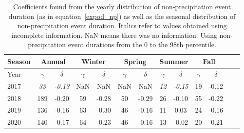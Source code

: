 \begin{table}[htb]
  \begin{center}
    \begin{tabular}{|l|*{11}{c|}r|}
      \hline Season & \multicolumn{2}{|c|}{Annual} &
      \multicolumn{2}{|c|}{Winter}& \multicolumn{2}{|c|}{Spring} &
      \multicolumn{2}{|c|}{Summer} &\multicolumn{2}{|c|}{Fall} \\ \hline
      Year & $\gamma $ & $\delta$ & $\gamma $ & $\delta$ & $\gamma $ &
      $\delta$ & $\gamma $ & $\delta$ & $\gamma $ & $\delta$\\ \hline 2017 &
      \textit{33} & \textit{-0.13} & NaN & NaN & NaN & NaN & \textit{12} &
      \textit{-0.15} & 19 & -0.12 \\ 2018 & 189 & -0.20 & 59 & -0.28 & 50 &
      -0.29 & 26 & -0.10 & 55 & -0.22 \\ 2019 & 136 & -0.16 & 63 & -0.30 &
      46 & -0.16 & 11 & 0.03 & 24 & -0.16 \\ 2020 & 140 & -0.17 & 64 & -0.23
      & 46 & -0.16 & 13 & -0.02 & 20 & -0.21 \\ \hline
    \end{tabular}
  \end{center}
  \caption[Year comparison of coefficients for non-precipitation events up
    to 98th percentile] {\label{thirdtable_98}Coefficients found from
    the yearly distribution of non-precipitation event duration (as in
    equation~\ref{expod_np}) as well as the seasonal distribution of
    non-precipitation event duration. Italics refer to values obtained using
    incomplete information. NaN means there was no information. Using
    non-precipitation event durations from the 0 to the 98th percentile.}
\end{table}
